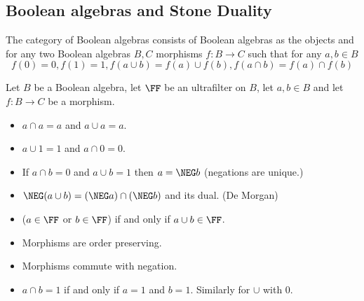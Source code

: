 \subsection{Boolean algebras and Stone Duality}
\begin{dfn}
    The category of Boolean algebras consists of Boolean algebras as the objects
    and for any two Boolean algebras $B, C$ morphisms $f:B \to C$ such that
    for any $a,b \in B$
    \[f(0) = 0, f(1) = 1, f(a \cup b) = f(a) \cup f(b), 
    f(a \cap b) = f(a) \cap f(b)\] 
\end{dfn}

\begin{lem}
    Let $B$ be a Boolean algebra, let $\FF$ be an ultrafilter
    on $B$, let $a,b \in B$ and let $f : B \to C$ be a morphism.
    \begin{itemize}
        \item $a \cap a = a$ and $a \cup a = a$.
        \item $a \cup 1 = 1$ and $a \cap 0 = 0$.
        \item If $a \cap b = 0$ and $a \cup b = 1$ then $a = \NEG b$
            (negations are unique.)
        \item $\NEG (a \cup b) = (\NEG a) \cap (\NEG b)$ and its dual. 
            (De Morgan)
        \item ($a \in \FF$ or $b \in \FF$) if and only if $a \cup b \in \FF$.
        \item Morphisms are order preserving.
        \item Morphisms commute with negation.
        \item $a \cap b = 1$ if and only if $a = 1$ and $b = 1$.
            Similarly for $\cup$ with $0$.
    \end{itemize}
\end{lem}
